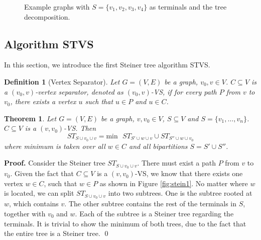 \documentclass[preprint,12pt]{elsarticle}
\newtheorem{theorem}{Theorem}
\newtheorem{definition}{Definition}
\newenvironment{proof}{\begin{trivlist}\item[]\textbf{Proof.}}{\end{trivlist}}
\begin{document}
\begin{figure*}[ht]
 \centering
\label{fig:subfigureExample}
\caption{Example graphs with $S=\{v_1, v_2, v_3, v_4\}$ as terminals and the tree decomposition.
}
 \label{fig:running}      
\end{figure*}

\subsection{Algorithm STVS}
\label{sec:stvs}

In this section, we introduce the first Steiner tree algorithm STVS.


\begin{definition} [Vertex Separator]
Let $G=(V,E)$ be a graph, $v_0, v \in V$. $C \subseteq V$ is a 
$(v_0, v)$-vertex separator, denoted as $(v_0, v)$-VS, if for every path $P$ from $v$ to $v_0$,
there exists a vertex $u$ such that $u \in P$ and $u \in C$.
\end{definition}

\begin{theorem}
Let $G=(V, E)$ be a graph, $v, v_0 \in V$, $S \subseteq V$ and $S = \{v_1, \ldots, v_n\}$.
$C \subseteq V$ is a $(v, v_0)$-VS. Then 
\begin{equation}
\label{equ:stvs1}
ST_{S \cup v_0 \cup v} = {\mbox{min}} ~~~ ST_{S' \cup w \cup v}  \cup ST_{S'' \cup w \cup v_0}
\end{equation}
where minimum is taken over all $w \in C$ and all  bipartitions
$S = S' \cup S''$.
\label{the:stvs}
\end{theorem}


\begin{figure}[ht]
 \centering
{}
\end{figure}





\begin{proof}
Consider the Steiner tree $ST_{S \cup v_0 \cup v}$.
There must exist a path $P$ from $v$ to $v_0$.
Given the fact that $C \subseteq V$ is a $(v, v_0)$-VS, 
we know that there exists one vertex $w \in C$, such that $w \in P$ as shown in Figure \ref{fig:stein1}.
No matter where $w$ is located, we can split $ST_{S \cup v_0 \cup v}$
into two subtrees. One is the subtree rooted at $w$, which contains $v$.
The other subtree contains
the rest of the terminals in $S$, together with $v_0$ and $w$. 
Each of the subtree is a Steiner tree regarding the terminals. 
It is trivial to show the minimum of both trees, due to the fact that
the entire tree is a Steiner tree. \qed
\end{proof}
\end{document}
